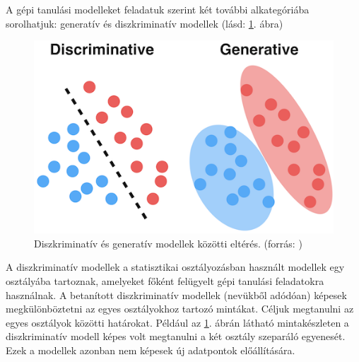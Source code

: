 


A gépi tanulási modelleket feladatuk szerint két további alkategóriába sorolhatjuk: generatív és diszkriminatív modellek (lásd: \ref{fig:gen_disc}. ábra)

\begin{figure}[ht]
	\centering
	\includegraphics[width=0.65\columnwidth]{figures/generative_discriminative.png}
	\caption{Diszkriminatív és generatív modellek közötti eltérés. (forrás: \cite{fig:generative_discriminative})}
	\label{fig:gen_disc}
\end{figure}

A diszkriminatív modellek a statisztikai osztályozásban használt modellek egy osztályába tartoznak, amelyeket főként felügyelt gépi tanulási feladatokra használnak. A betanított diszkriminatív modellek (nevükből adódóan) képesek megkülönböztetni az egyes osztályokhoz tartozó mintákat. Céljuk megtanulni az egyes osztályok közötti határokat. Például az \ref{fig:gen_disc}. ábrán látható mintakészleten a diszkriminatív modell képes volt megtanulni a két osztály szeparáló egyenesét. Ezek a modellek azonban nem képesek új adatpontok előállítására.

